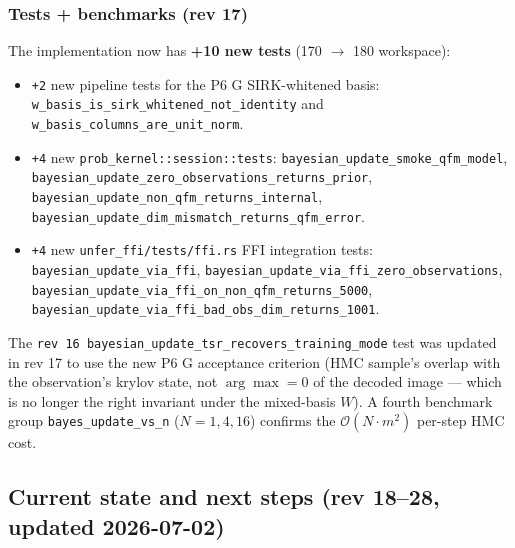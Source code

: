 \documentclass[11pt, a4paper]{article}
\begin{document}
\subsubsection*{Tests + benchmarks (rev 17)}

The implementation now has \textbf{+10 new tests} (170 $\to$ 180
workspace):

\begin{itemize}
\item \texttt{+2} new pipeline tests for the P6 G SIRK-whitened
  basis: \texttt{w\_basis\_is\_sirk\_whitened\_not\_identity} and
  \texttt{w\_basis\_columns\_are\_unit\_norm}.
\item \texttt{+4} new \texttt{prob\_kernel::session::tests}:
  \texttt{bayesian\_update\_smoke\_qfm\_model},
  \texttt{bayesian\_update\_zero\_observations\_returns\_prior},
  \texttt{bayesian\_update\_non\_qfm\_returns\_internal},
  \texttt{bayesian\_update\_dim\_mismatch\_returns\_qfm\_error}.
\item \texttt{+4} new \texttt{unfer\_ffi/tests/ffi.rs} FFI
  integration tests:
  \texttt{bayesian\_update\_via\_ffi},
  \texttt{bayesian\_update\_via\_ffi\_zero\_observations},
  \texttt{bayesian\_update\_via\_ffi\_on\_non\_qfm\_returns\_5000},
  \texttt{bayesian\_update\_via\_ffi\_bad\_obs\_dim\_returns\_1001}.
\end{itemize}

The \texttt{rev 16 bayesian\_update\_tsr\_recovers\_training\_mode}
test was updated in rev 17 to use the new P6 G acceptance
criterion (HMC sample's overlap with the observation's krylov
state, not $\arg\max = 0$ of the decoded image --- which is no
longer the right invariant under the mixed-basis $W$). A fourth
benchmark group \texttt{bayes\_update\_vs\_n} ($N = 1, 4, 16$)
confirms the $\mathcal{O}(N \cdot m^2)$ per-step HMC cost.

\subsection{Current state and next steps (rev 18--28, updated 2026-07-02)}
\end{document}
